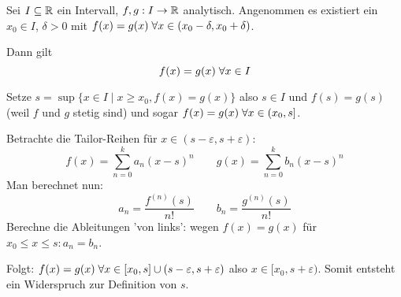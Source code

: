\documentclass[main.tex]{subfiles}
\begin{document}
\begin{Bemerkung}
  \begin{Theorem}
      Sei $I \subseteq \mathbb{R}$ ein Intervall, $f,g:I \to \mathbb{R}$ analytisch. Angenommen es existiert ein $x_0 \in I$, $\delta > 0$ mit $f(x) = g(x) \;\forall x \in (x_0 -\delta, x_0 + \delta)$.

      Dann gilt
      $$f(x) = g(x) \;\forall x \in I$$
  \end{Theorem}
  \begin{Beweis}
    Setze $s = \sup\{x \in I \mid x \geq x_0, f(x) = g(x)\}$ also $s \in I$ und $f(s) = g(s)$ (weil $f$ und $g$ stetig sind) und sogar $f(x) = g(x) \;\forall x\in (x_0,s]$.

    Betrachte die Tailor-Reihen für $x \in (s-\varepsilon, s+ \varepsilon)$:
    $$f(x) = \sum \limits_{n=0}^k a_n (x-s)^n \qquad g(x) = \sum \limits_{n=0}^k b_n (x-s)^n$$
    Man berechnet nun:
    $$a_n = \dfrac{f^{(n)}(s)}{n!} \qquad b_n = \dfrac{g^{(n)}(s)}{n!}$$
    Berechne die Ableitungen 'von links': wegen $f(x) = g(x)$ für $x_0 \leq x \leq s : a_n = b_n$.

    Folgt: $f(x) = g(x) \;\forall x \in [x_0,s] \cup (s- \varepsilon,s+\varepsilon)$ also $x \in [x_0,s+\varepsilon)$. Somit entsteht ein Widerspruch zur Definition von $s$.
  \end{Beweis}
\end{Bemerkung}
\end{document}
